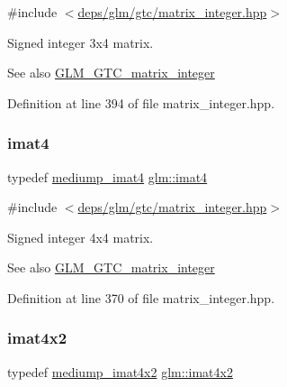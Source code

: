 {\ttfamily \#include $<$\hyperlink{matrix__integer_8hpp}{deps/glm/gtc/matrix\+\_\+integer.\+hpp}$>$}

Signed integer 3x4 matrix. \begin{DoxySeeAlso}{See also}
\hyperlink{group__gtc__matrix__integer}{G\+L\+M\+\_\+\+G\+T\+C\+\_\+matrix\+\_\+integer} 
\end{DoxySeeAlso}


Definition at line 394 of file matrix\+\_\+integer.\+hpp.

\mbox{\label{group__gtc__matrix__integer_ga40fc5c5e0b07543497aa1c314891544a}} 
\subsubsection{\texorpdfstring{imat4}{imat4}}
{\footnotesize\ttfamily typedef \hyperlink{group__gtc__matrix__integer_ga3ce415f7039ec7f1ad5bffa14d226e80}{mediump\+\_\+imat4} \hyperlink{group__gtc__matrix__integer_ga40fc5c5e0b07543497aa1c314891544a}{glm\+::imat4}}



{\ttfamily \#include $<$\hyperlink{matrix__integer_8hpp}{deps/glm/gtc/matrix\+\_\+integer.\+hpp}$>$}

Signed integer 4x4 matrix. \begin{DoxySeeAlso}{See also}
\hyperlink{group__gtc__matrix__integer}{G\+L\+M\+\_\+\+G\+T\+C\+\_\+matrix\+\_\+integer} 
\end{DoxySeeAlso}


Definition at line 370 of file matrix\+\_\+integer.\+hpp.

\mbox{\label{group__gtc__matrix__integer_ga7e733984837e0e7aa9f4aac18f632f63}} 
\subsubsection{\texorpdfstring{imat4x2}{imat4x2}}
{\footnotesize\ttfamily typedef \hyperlink{group__gtc__matrix__integer_ga536fe339834f7e764672c22c63ec543b}{mediump\+\_\+imat4x2} \hyperlink{group__gtc__matrix__integer_ga7e733984837e0e7aa9f4aac18f632f63}{glm\+::imat4x2}}



